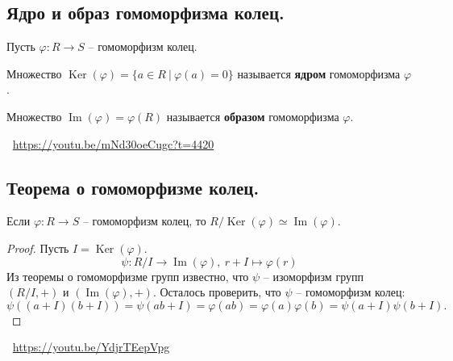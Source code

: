 \subsection{Ядро и образ гомоморфизма колец.}
Пусть $\varphi : R \to S$ -- гомоморфизм колец.
\begin{definition}
    Множество $\operatorname{Ker}(\varphi) = \{ a \in R \> | \> \varphi(a) = 0 \}$ называется \textbf{ядром} гомоморфизма $\varphi$.
\end{definition}
\begin{definition}
    Множество $\operatorname{Im}(\varphi) = \varphi(R)$ называется \textbf{образом} гомоморфизма $\varphi$.
\end{definition}
\large \faYoutube \normalsize $\>$ \url{https://youtu.be/mNd30oeCugc?t=4420}

\subsection{Теорема о гомоморфизме колец.}
\begin{theorem}
    Если $\varphi : R \to S$ -- гомоморфизм колец, то $R / \operatorname{Ker}(\varphi) \simeq \operatorname{Im}(\varphi)$.
    \begin{proof}
        Пусть $I = \operatorname{Ker}(\varphi)$.
        \[
            \psi : R / I \to \operatorname{Im}(\varphi), \> r + I \mapsto \varphi(r)
        \]
        Из теоремы о гомоморфизме групп известно, что $\psi$ -- изоморфизм групп $(R / I, +)$ и $(\operatorname{Im}(\varphi), +)$. Осталось проверить, что $\psi$ -- гомоморфизм колец:
        \[
            \psi((a + I)(b + I)) = \psi(ab + I) = \varphi(ab) = \varphi(a)\varphi(b) = \psi(a + I)\psi(b + I). 
        \]
    \end{proof}
\end{theorem}
\large \faYoutube \normalsize $\>$ \url{https://youtu.be/YdjrTEepVpg}